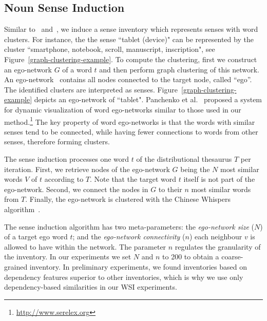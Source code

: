 \documentclass[11pt]{article}
\begin{document}
\subsection{Noun Sense Induction}

Similar to~\cite{pantel2002} and~\cite{Biemann2006}, we induce a sense inventory which represents senses with word clusters. For instance, the the sense ``tablet (device)" can be represented by the cluster ``smartphone, notebook, scroll, manuscript, inscription", see Figure~\ref{graph-clustering-example}. To compute the clustering, first we construct an ego-network $G$ of a word $t$ and then perform graph clustering of this network. An ego-network~\cite{everett2005ego_ALT} contains all nodes connected to the target node, called ``ego''. The identified clusters are interpreted as senses. Figure~\ref{graph-clustering-example} depicts an ego-network of ``tablet". Panchenko et al.~ proposed a system for dynamic visualization of word ego-networks similar to those used in our method.\footnote{\url{http://www.serelex.org}} The key property of word ego-networks is that the words with similar senses tend to be connected, while having fewer connections to words from other senses, therefore forming clusters. 

The sense induction 
processes one word $t$ of the distributional thesaurus $T$ per iteration. First, we retrieve nodes of the ego-network $G$ being the $N$ most similar words $V$ of $t$ according to $T$. Note that the target word $t$ itself is not part of the ego-network. Second, we connect the nodes in $G$ to their $n$ most similar words from $T$. %
Finally, the ego-network is clustered with the Chinese Whispers algorithm~\cite{Biemann2006}.

The sense induction algorithm has two meta-parameters: the \emph{ego-network size} ($N$) of a target ego word $t$; and the \emph{ego-network connectivity} ($n$) each neighbour $v$ is allowed to have within the network. The parameter $n$ regulates the granularity of the inventory. In our experiments we set $N$ and $n$ to 200 to obtain a coarse-grained inventory. In preliminary experiments, we found inventories based on dependency features superior to other inventories, which is why we use only dependency-based similarities in our WSI experiments. 
\end{document}
